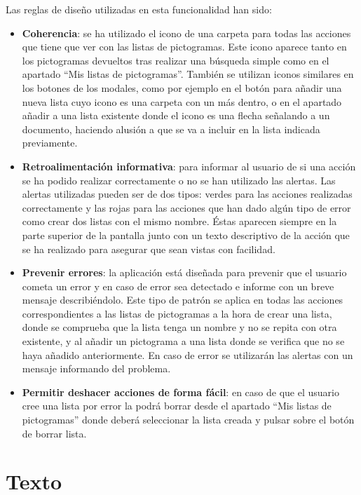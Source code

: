 Las reglas de diseño utilizadas en esta funcionalidad han sido:
\begin{itemize}
	\item \textbf{Coherencia}: se ha utilizado el icono de una carpeta para todas las acciones que tiene que ver con las listas de pictogramas. Este icono aparece tanto en los pictogramas devueltos tras realizar una búsqueda simple como en el apartado “Mis listas de pictogramas”.  También se utilizan iconos similares en los botones de los modales, como por ejemplo en el botón para añadir una nueva lista cuyo icono es una carpeta con un más dentro, o en el apartado añadir a una lista existente donde el icono es una flecha señalando a un documento, haciendo alusión a que se va a incluir en la lista indicada previamente.
	
	\item \textbf{Retroalimentación informativa}: para informar al usuario de si una acción se ha podido realizar correctamente o no se han utilizado las alertas. Las alertas utilizadas pueden ser de dos tipos: verdes para las acciones realizadas correctamente y las rojas para las acciones que han dado algún tipo de error como crear dos listas con el mismo nombre. Éstas aparecen siempre en la parte superior de la pantalla junto con un texto descriptivo de la acción que se ha realizado para asegurar que sean vistas con facilidad.
	
	\item \textbf{Prevenir errores}: la aplicación está diseñada para prevenir que el usuario cometa un error y en caso de error sea detectado e informe con un breve mensaje describiéndolo. Este tipo de patrón se aplica en todas las acciones correspondientes a las listas de pictogramas a la hora de crear una lista, donde se comprueba que la lista tenga un nombre y no se repita con otra existente, y al añadir un pictograma a una lista donde se verifica que no se haya añadido anteriormente. En caso de error se utilizarán las alertas con un mensaje informando del problema.
	
	
	\item \textbf{Permitir deshacer acciones de forma fácil}: en caso de que el usuario cree una lista por error la podrá borrar desde el apartado “Mis listas de pictogramas” donde deberá seleccionar la lista creada y pulsar sobre el botón de borrar lista.
	
\end{itemize}


\section{Texto}

